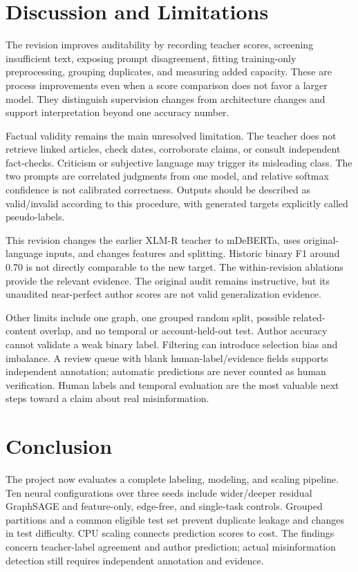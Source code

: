 \documentclass[conference]{IEEEtran}
\begin{document}
\balance
\section{Discussion and Limitations}
The revision improves auditability by recording teacher scores, screening insufficient text, exposing prompt disagreement, fitting training-only preprocessing, grouping duplicates, and measuring added capacity. These are process improvements even when a score comparison does not favor a larger model. They distinguish supervision changes from architecture changes and support interpretation beyond one accuracy number.

Factual validity remains the main unresolved limitation. The teacher does not retrieve linked articles, check dates, corroborate claims, or consult independent fact-checks. Criticism or subjective language may trigger its misleading class. The two prompts are correlated judgments from one model, and relative softmax confidence is not calibrated correctness. Outputs should be described as valid/invalid according to this procedure, with generated targets explicitly called pseudo-labels.

This revision changes the earlier XLM-R teacher to mDeBERTa, uses original-language inputs, and changes features and splitting. Historic binary F1 around 0.70 is not directly comparable to the new target. The within-revision ablations provide the relevant evidence. The original audit remains instructive, but its unaudited near-perfect author scores are not valid generalization evidence.

Other limits include one graph, one grouped random split, possible related-content overlap, and no temporal or account-held-out test. Author accuracy cannot validate a weak binary label. Filtering can introduce selection bias and imbalance. A review queue with blank human-label/evidence fields supports independent annotation; automatic predictions are never counted as human verification. Human labels and temporal evaluation are the most valuable next steps toward a claim about real misinformation.

\section{Conclusion}
The project now evaluates a complete labeling, modeling, and scaling pipeline. Ten neural configurations over three seeds include wider/deeper residual GraphSAGE and feature-only, edge-free, and single-task controls. Grouped partitions and a common eligible test set prevent duplicate leakage and changes in test difficulty. CPU scaling connects prediction scores to cost. The findings concern teacher-label agreement and author prediction; actual misinformation detection still requires independent annotation and evidence.
\end{document}
